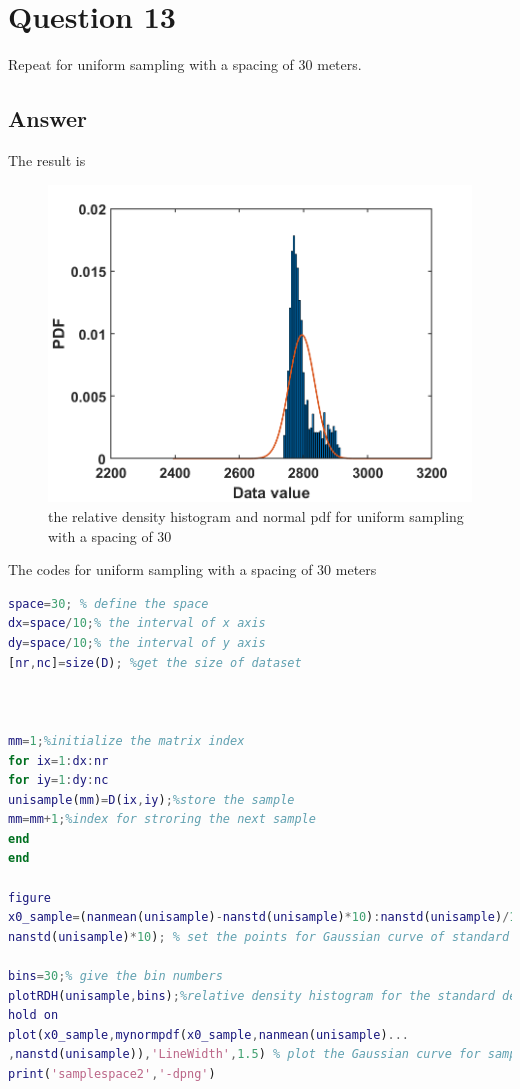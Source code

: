 \documentclass[
	12pt, %
]{fphw}
\begin{document}
\clearpage
 \section*{Question 13 }

\begin{problem}
Repeat for uniform sampling with a spacing of 30 meters.
	
\end{problem}

\subsection*{Answer}
The result is

\begin{figure}[htbp]
	\centering
	\includegraphics[width=0.8\columnwidth]{samplespace2.png} 
	\caption{ the relative density histogram and normal pdf for uniform sampling with a spacing of 30}
\end{figure}

The codes for uniform sampling with a spacing of 30 meters

\begin{lstlisting}[language=Matlab,escapeinside=``]
space=30; % define the space
dx=space/10;% the interval of x axis
dy=space/10;% the interval of y axis
[nr,nc]=size(D); %get the size of dataset



mm=1;%initialize the matrix index
for ix=1:dx:nr
for iy=1:dy:nc
unisample(mm)=D(ix,iy);%store the sample
mm=mm+1;%index for stroring the next sample     
end
end

figure
x0_sample=(nanmean(unisample)-nanstd(unisample)*10):nanstd(unisample)/10:(nanmean(unisample)+...
nanstd(unisample)*10); % set the points for Gaussian curve of standard deviation of sample

bins=30;% give the bin numbers
plotRDH(unisample,bins);%relative density histogram for the standard deviation value
hold on
plot(x0_sample,mynormpdf(x0_sample,nanmean(unisample)...
,nanstd(unisample)),'LineWidth',1.5) % plot the Gaussian curve for samples
print('samplespace2','-dpng')
\end{lstlisting}
\end{document}
